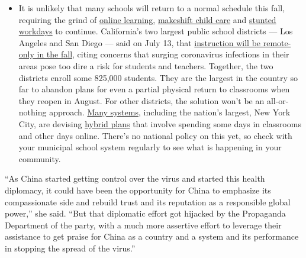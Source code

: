 \begin{itemize}
  \begin{itemize}
  \tightlist
  \item
    It is unlikely that many schools will return to a normal schedule
    this fall, requiring the grind of
    \href{https://www.nytimes.com/2020/06/05/us/coronavirus-education-lost-learning.html?action=click\&pgtype=Article\&state=default\&region=MAIN_CONTENT_3\&context=storylines_faq}{online
    learning},
    \href{https://www.nytimes.com/2020/05/29/us/coronavirus-child-care-centers.html?action=click\&pgtype=Article\&state=default\&region=MAIN_CONTENT_3\&context=storylines_faq}{makeshift
    child care} and
    \href{https://www.nytimes.com/2020/06/03/business/economy/coronavirus-working-women.html?action=click\&pgtype=Article\&state=default\&region=MAIN_CONTENT_3\&context=storylines_faq}{stunted
    workdays} to continue. California's two largest public school
    districts --- Los Angeles and San Diego --- said on July 13, that
    \href{https://www.nytimes.com/2020/07/13/us/lausd-san-diego-school-reopening.html?action=click\&pgtype=Article\&state=default\&region=MAIN_CONTENT_3\&context=storylines_faq}{instruction
    will be remote-only in the fall}, citing concerns that surging
    coronavirus infections in their areas pose too dire a risk for
    students and teachers. Together, the two districts enroll some
    825,000 students. They are the largest in the country so far to
    abandon plans for even a partial physical return to classrooms when
    they reopen in August. For other districts, the solution won't be an
    all-or-nothing approach.
    \href{https://bioethics.jhu.edu/research-and-outreach/projects/eschool-initiative/school-policy-tracker/}{Many
    systems}, including the nation's largest, New York City, are
    devising
    \href{https://www.nytimes.com/2020/06/26/us/coronavirus-schools-reopen-fall.html?action=click\&pgtype=Article\&state=default\&region=MAIN_CONTENT_3\&context=storylines_faq}{hybrid
    plans} that involve spending some days in classrooms and other days
    online. There's no national policy on this yet, so check with your
    municipal school system regularly to see what is happening in your
    community.
  \end{itemize}
\end{itemize}

``As China started getting control over the virus and started this
health diplomacy, it could have been the opportunity for China to
emphasize its compassionate side and rebuild trust and its reputation as
a responsible global power,'' she said. ``But that diplomatic effort got
hijacked by the Propaganda Department of the party, with a much more
assertive effort to leverage their assistance to get praise for China as
a country and a system and its performance in stopping the spread of the
virus.''

